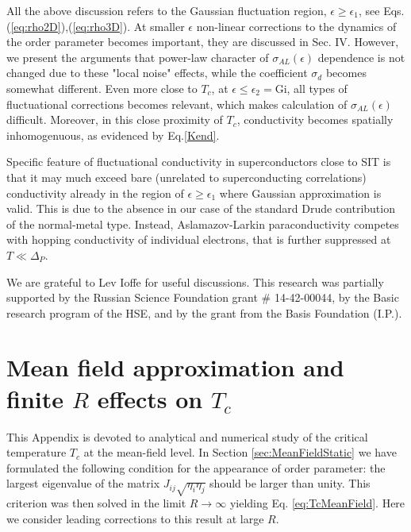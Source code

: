 \documentclass[twocolumn,english,prb]{revtex4-1}
\begin{document}
All the above discussion refers to the Gaussian fluctuation region, $\epsilon \geq \epsilon_1$, see 
Eqs.(\ref{eq:rho2D}),(\ref{eq:rho3D}).  At smaller $\epsilon$ non-linear corrections to the dynamics of the order parameter
becomes important, they are discussed in Sec. IV.  However, we present  the arguments  that power-law character
of $\sigma_{AL}(\epsilon)$ dependence is not changed due to these "local noise" effects, while the coefficient
$\sigma_d$ becomes somewhat different.  Even more close to $T_c$, at $\epsilon \leq\epsilon_2 = \mathrm{Gi}$, all types
of fluctuational corrections becomes relevant,  which makes calculation of $\sigma_{AL}(\epsilon)$ difficult.
Moreover, in this close proximity of $T_c$, conductivity becomes spatially inhomogenuous, 
as evidenced by Eq.\eqref{Kend}.

Specific feature of fluctuational conductivity in superconductors close to SIT is that it may  much exceed bare 
(unrelated to superconducting correlations) conductivity already in the region of $\epsilon \geq \epsilon_1$ where
Gaussian approximation is valid.  This is due to the absence in our case of the standard Drude contribution of the 
normal-metal type.  Instead, Aslamazov-Larkin paraconductivity competes with hopping conductivity of individual
electrons, that is further suppressed at $T \ll \Delta_P$.


We are grateful to  Lev Ioffe  for useful discussions. This research was partially supported by the 
Russian Science Foundation grant \# 14-42-00044, by the Basic research program of the HSE,  
and  by the grant from the Basis Foundation (I.P.).


\appendix
\section{Mean field approximation and finite $R$ effects on $T_c$}
\label{sec:AppendixSCBA}
This Appendix is devoted to analytical and numerical study of the critical temperature $T_c$ at the mean-field level. In  Section \ref{sec:MeanFieldStatic} we have formulated the following condition for the appearance of order parameter: the largest eigenvalue of the matrix $J_{ij} \sqrt{\eta_i \eta_j}$ should be larger than unity. This criterion was then solved in the limit
 $R \to \infty$ yielding Eq. \eqref{eq:TcMeanField}.  Here we consider leading corrections to this result at large $R$.
\end{document}

